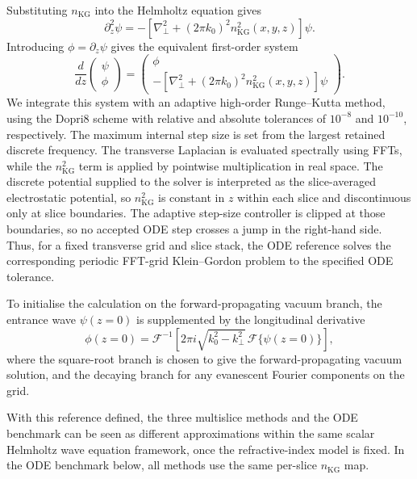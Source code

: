 \documentclass[preprint,12pt,number]{elsarticle}
\begin{document}
Substituting $n_\mathrm{KG}$ into the Helmholtz equation gives
\begin{equation}
\label{eq:kg_second_order}
\partial_z^2\psi
=
-\left[\nabla_\perp^2+(2\pi k_0)^2n_\mathrm{KG}^2(x,y,z)\right]\psi.
\end{equation}
Introducing $\phi=\partial_z\psi$ gives the equivalent first-order system
\begin{equation}
\label{eq:kg_state}
\frac{d}{dz}
\begin{pmatrix}
\psi\\
\phi
\end{pmatrix}
=
\begin{pmatrix}
\phi\\
-\left[\nabla_\perp^2+(2\pi k_0)^2n_\mathrm{KG}^2(x,y,z)\right]\psi
\end{pmatrix}.
\end{equation}
We integrate this system with an adaptive high-order Runge--Kutta method,
using the Dopri8 scheme with relative and absolute tolerances of $10^{-8}$ and
$10^{-10}$, respectively. The maximum internal step size is set from the
largest retained discrete frequency. The transverse Laplacian
is evaluated spectrally using FFTs, while the $n_\mathrm{KG}^2$ term is applied
by pointwise multiplication in real space. The discrete potential
supplied to the solver is interpreted as the slice-averaged electrostatic
potential, so $n_\mathrm{KG}^2$ is constant in $z$ within each slice and
discontinuous only at slice boundaries. The adaptive step-size controller is
clipped at those boundaries, so no accepted ODE step crosses a jump in the
right-hand side.
Thus, for a fixed transverse grid and slice stack, the ODE reference solves the
corresponding periodic FFT-grid Klein--Gordon problem to the specified ODE
tolerance. 

To initialise the calculation on the forward-propagating vacuum branch, the
entrance wave $\psi(z=0)$ is supplemented by the longitudinal derivative
\begin{equation}
\label{eq:kg_phi0}
\phi(z=0)
=
\mathcal F^{-1}
\left[
2\pi i\sqrt{k_0^2-k_\perp^2}\,
\mathcal F\{\psi(z=0)\}
\right],
\end{equation}
where the square-root branch is chosen to give the forward-propagating vacuum
solution, and the decaying branch for any evanescent Fourier components on the
grid. 

With this reference defined, the three multislice methods and the ODE benchmark
can be seen as different approximations within the same scalar Helmholtz wave equation framework, once
the refractive-index model is fixed. In the ODE benchmark below, all methods
use the same per-slice $n_\mathrm{KG}$ map.
\end{document}
